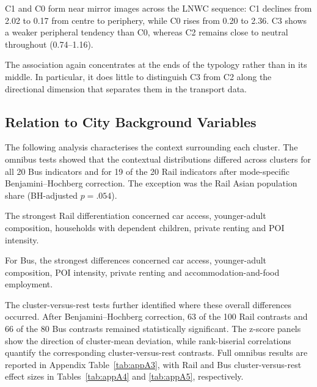 C1 and C0 form near mirror images across the LNWC sequence: C1 declines from 2.02 to 0.17 from centre to periphery, while C0 rises from 0.20 to 2.36. C3 shows a weaker peripheral tendency than C0, whereas C2 remains close to neutral throughout (0.74--1.16).

The association again concentrates at the ends of the typology rather than in its middle. In particular, it does little to distinguish C3 from C2 along the directional dimension that separates them in the transport data.

\subsection{Relation to City Background Variables}

The following analysis characterises the context surrounding each cluster. The omnibus tests showed that the contextual distributions differed across clusters for all 20 Bus indicators and for 19 of the 20 Rail indicators after mode-specific Benjamini--Hochberg correction. The exception was the Rail Asian population share (BH-adjusted $p = .054$).

The strongest Rail differentiation concerned car access, younger-adult composition, households with dependent children, private renting and POI intensity.

For Bus, the strongest differences concerned car access, younger-adult composition, POI intensity, private renting and accommodation-and-food employment.

The cluster-versus-rest tests further identified where these overall differences occurred. After Benjamini--Hochberg correction, 63 of the 100 Rail contrasts and 66 of the 80 Bus contrasts remained statistically significant. The z-score panels show the direction of cluster-mean deviation, while rank-biserial correlations quantify the corresponding cluster-versus-rest contrasts. Full omnibus results are reported in Appendix Table~\ref{tab:appA3}, with Rail and Bus cluster-versus-rest effect sizes in Tables~\ref{tab:appA4} and \ref{tab:appA5}, respectively.

